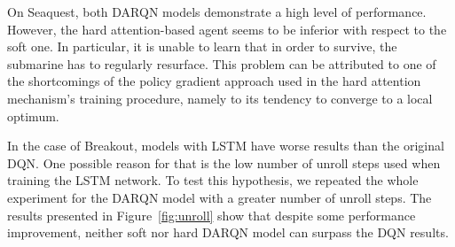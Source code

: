 \documentclass{article} \usepackage{nips15submit_e,times}
\begin{document}
On Seaquest, both DARQN models demonstrate a high level of performance. However, the hard attention-based agent seems to be inferior with respect to the soft one. In particular, it is unable to learn that in order to survive, the submarine has to regularly resurface. This problem can be attributed to one of the shortcomings of the policy gradient approach used in the hard attention mechanism's training procedure, namely to its tendency to converge to a local optimum. 

In the case of Breakout, models with LSTM have worse results than the original DQN. One possible reason for that is the low number of unroll steps used when training the LSTM network. To test this hypothesis, we repeated the whole experiment for the DARQN model with a greater number of unroll steps. The results presented in Figure~\ref{fig:unroll} show that despite some performance improvement, neither soft nor hard DARQN model can surpass the DQN results.
\end{document}

